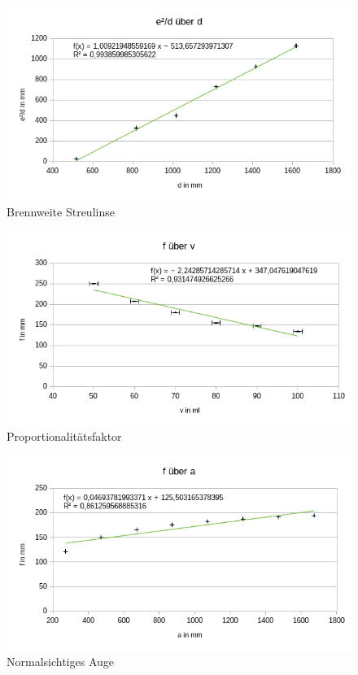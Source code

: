 \documentclass[a4paper, 12pt]{article}
\begin{document}
\begin{figure}
\centering
\includegraphics[scale=0.7]{13.png}
\caption{Brennweite Streulinse}
\label{Abb1.3}
\end{figure}

\begin{figure}
\centering
\includegraphics[scale=0.7]{21.png}
\caption{Proportionalitätsfaktor}
\label{Abb2.1}
\end{figure}

\begin{figure}
\centering
\includegraphics[scale=0.7]{22.png}
\caption{Normalsichtiges Auge}
\label{Abb2.2}
\end{figure}
\end{document}
